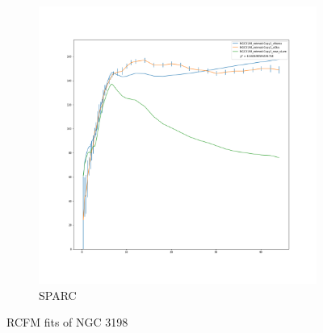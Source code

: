 \documentclass[reprint,%
 amsmath,amssymb,
 aps,
]{revtex4-1}
\begin{document}
\begin{figure}[h]
\begin{subfigure}{.5\textwidth}
  \centering
  \includegraphics[width=.8\linewidth]{NGC3198_rotmod-Copy1_XueSofue}
  \caption{SPARC\cite{2016Lelli}}
  \label{fig:sfig8}
\end{subfigure}
\caption{RCFM fits  of NGC 3198}
\label{fig:fig3198}
\end{figure}
%
% 
\clearpage
\end{document}
